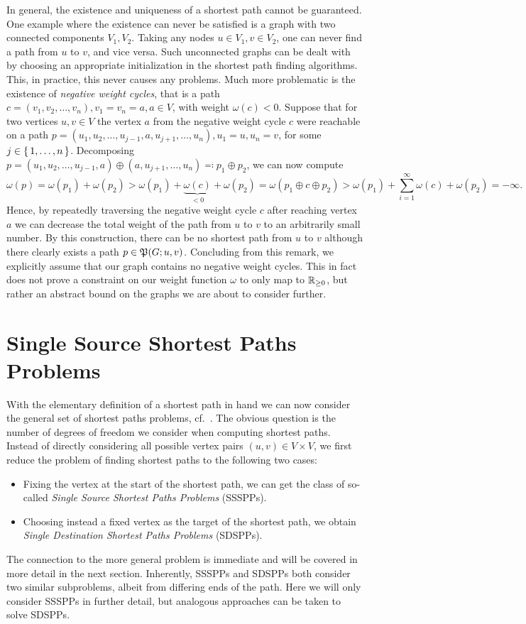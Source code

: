 In general, the existence and uniqueness of a shortest path cannot be guaranteed.
One example where the existence can never be satisfied is a graph with two connected components $V_1, V_2$.
Taking any nodes $u \in V_1, v \in V_2$, one can never find a path from $u$ to $v$, and vice versa.
Such unconnected graphs can be dealt with by choosing an appropriate initialization in the shortest path finding algorithms.
This, in practice, this never causes any problems.
Much more problematic is the existence of \emph{negative weight cycles}, that is a path $c = (v_1, v_2, \dots, v_n), v_1 = v_n = a, a \in V$, with weight $\omega(c) < 0$.
Suppose that for two vertices $u, v \in V$ the vertex $a$ from the negative weight cycle $c$ were reachable on a path $p = (u_1, u_2, \dots, u_{j - 1}, a, u_{j + 1}, \dots, u_n), u_1 = u, u_n = v$, for some $j \in \left\{\,1, \dots, n\,\right\}$.
Decomposing $p = (u_1, u_2, \dots, u_{j - 1}, a) \oplus (a, u_{j + 1}, \dots, u_n) \eqqcolon p_1 \oplus p_2$, we can now compute
\[
    \omega(p) = \omega(p_1) + \omega(p_2) > \omega(p_1) + \underbrace{\omega(c)}_{< 0} + \omega(p_2) = \omega(p_1 \oplus c \oplus p_2) > \omega(p_1) + \sum\limits_{i = 1}^\infty \omega(c) + \omega(p_2) = -\infty.
\]
Hence, by repeatedly traversing the negative weight cycle $c$ after reaching vertex $a$ we can decrease the total weight of the path from $u$ to $v$ to an arbitrarily small number.
By this construction, there can be no shortest path from $u$ to $v$ although there clearly exists a path $p \in \mathfrak{P}(G; u, v)$.
Concluding from this remark, we explicitly assume that our graph contains no negative weight cycles.
This in fact does not prove a constraint on our weight function $\omega$ to only map to $\mathbb{R}_{\ge 0}$, but rather an abstract bound on the graphs we are about to consider further.

\section{Single Source Shortest Paths Problems}

With the elementary definition of a shortest path in hand we can now consider the general set of shortest paths problems, cf.~\cite[Chapter~24]{Cormen2001}.
The obvious question is the number of degrees of freedom we consider when computing shortest paths.
Instead of directly considering all possible vertex pairs $(u, v) \in V \times V$, we first reduce the problem of finding shortest paths to the following two cases:
\begin{itemize}
    \item Fixing the vertex at the start of the shortest path, we can get the class of so-called \emph{Single Source Shortest Paths Problems} (SSSPPs).
    \item Choosing instead a fixed vertex as the target of the shortest path, we obtain \emph{Single Destination Shortest Paths Problems} (SDSPPs).
\end{itemize}
The connection to the more general problem is immediate and will be covered in more detail in the next section.
Inherently, SSSPPs and SDSPPs both consider two similar subproblems, albeit from differing ends of the path.
Here we will only consider SSSPPs in further detail, but analogous approaches can be taken to solve SDSPPs.

